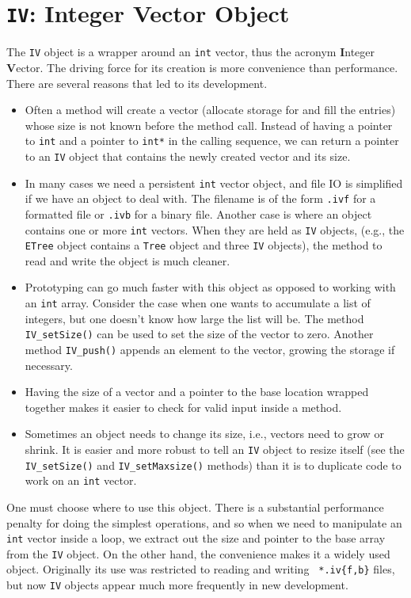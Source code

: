 \chapter{{\tt IV}: Integer Vector Object}
\par
The {\tt IV} object is a wrapper around an {\tt int} vector,
thus the acronym {\bf I}nteger {\bf V}ector.
The driving force for its creation is more convenience than 
performance.
There are several reasons that led to its development.
\begin{itemize}
\item 
Often a method will create a vector (allocate storage for and fill
the entries) whose size is not known before the method call.
Instead of having a pointer to {\tt int} and a pointer to {\tt int*}
in the calling sequence, we can return a pointer to an {\tt IV}
object that contains the newly created vector and its size.
\item
In many cases we need a persistent {\tt int} vector object,
and file IO is simplified if we have an object to deal with.
The filename is of the form {\tt *.ivf} for a formatted file
or {\tt *.ivb} for a binary file.
Another case is where an object contains one or more {\tt int}
vectors.
When they are held as {\tt IV} objects, (e.g., the {\tt ETree}
object contains a {\tt Tree} object and three {\tt IV} objects),
the method to read and write the object is much cleaner.
\item
Prototyping can go much faster with this object as opposed to
working with an {\tt int} array.
Consider the case when one wants to accumulate a list of integers,
but one doesn't know how large the list will be.
The method {\tt IV\_setSize()} can be used to set 
the size of the vector to zero.
Another method {\tt IV\_push()} appends an element to the vector,
growing the storage if necessary.
\item
Having the size of a vector and a pointer to the base location
wrapped together makes it easier to check for valid input inside 
a method.
\item
Sometimes an object needs to change its size, i.e., vectors need to
grow or shrink.
It is easier and more robust to tell an {\tt IV} object to resize
itself (see the {\tt IV\_setSize()} and {\tt IV\_setMaxsize()} 
methods) than it is to duplicate code to work on an {\tt int} vector.
\end{itemize}
One must choose where to use this object.
There is a substantial performance penalty for doing the simplest
operations, and so when we need to manipulate an {\tt int} vector
inside a loop, we extract out the size and pointer to the base
array from the {\tt IV} object.
On the other hand, the convenience makes it a widely used object.
Originally its use was restricted to reading and writing {\tt
*.iv\{f,b\}} files, but now {\tt IV} objects appear much more
frequently in new development.
\par

